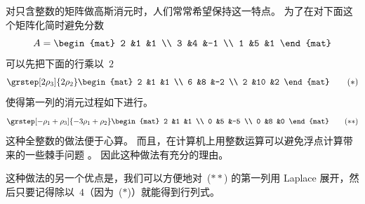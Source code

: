 
对只含整数的矩阵做高斯消元时，人们常常希望保持这一特点。
为了在对下面这个矩阵化简时避免分数
\begin{equation*}
  A=
  \begin{mat}
    2 &1 &1 \\
    3 &4 &-1 \\
    1 &5 &1 
  \end{mat}
\end{equation*}
可以先把下面的行乘以~$2$
\begin{equation*}
  \grstep[2\rho_3]{2\rho_2}
  \begin{mat}
    2 &1 &1 \\
    6 &8 &-2 \\
    2 &10 &2 
  \end{mat}
  \tag{$*$}
\end{equation*}
使得第一列的消元过程如下进行。
\begin{equation*}
  \grstep[-\rho_1+\rho_3]{-3\rho_1+\rho_2}
  \begin{mat}
    2 &1 &1 \\
    0 &5 &-5 \\
    0 &8 &0 
  \end{mat}
  \tag{$**$}
\end{equation*}
这种全整数的做法便于心算。
而且，在计算机上用整数运算可以避免浮点计算带来的一些棘手问题 \cite{Kahan}。
因此这种做法有充分的理由。

这种做法的另一个优点是，我们可以方便地对~($**$) 的第一列用
Laplace 展开，然后只要记得除以~$4$（因为~($*$)）就能得到行列式。

